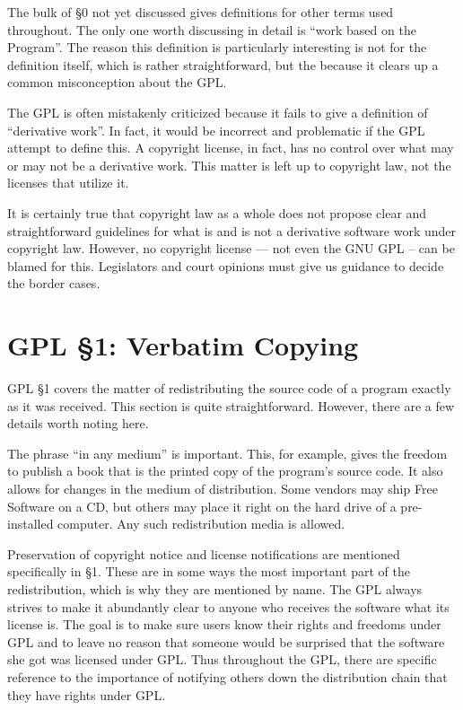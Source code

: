 \documentclass[12pt]{report}
\begin{document}
\medskip

The bulk of \S 0 not yet discussed gives definitions for other terms used
throughout.  The only one worth discussing in detail is ``work based on
the Program''.  The reason this definition is particularly interesting is
not for the definition itself, which is rather straightforward, but the
because it clears up a common misconception about the GPL\@.

The GPL is often mistakenly criticized because it fails to give a
definition of ``derivative work''.  In fact, it would be incorrect and
problematic if the GPL attempt to define this.  A copyright license, in
fact, has no control over what may or may not be a derivative work.  This
matter is left up to copyright law, not the licenses that utilize it.

It is certainly true that copyright law as a whole does not propose clear
and straightforward guidelines for what is and is not a derivative
software work under copyright law.  However, no copyright license --- not
even the GNU GPL -- can be blamed for this.  Legislators and court
opinions must give us guidance to decide the border cases.

\section{GPL \S 1: Verbatim Copying}

GPL \S 1 covers the matter of redistributing the source code of a program
exactly as it was received.  This section is quite straightforward.
However, there are a few details worth noting here.

The phrase ``in any medium'' is important.  This, for example, gives the
freedom to publish a book that is the printed copy of the program's source
code.  It also allows for changes in the medium of distribution.  Some
vendors may ship Free Software on a CD, but others may place it right on
the hard drive of a pre-installed computer.  Any such redistribution media
is allowed.

Preservation of copyright notice and license notifications are mentioned
specifically in \S 1.  These are in some ways the most important part of
the redistribution, which is why they are mentioned by name.  The GPL
always strives to make it abundantly clear to anyone who receives the
software what its license is.  The goal is to make sure users know their
rights and freedoms under GPL and to leave no reason that someone would be
surprised that the software she got was licensed under GPL\@.  Thus
throughout the GPL, there are specific reference to the importance of
notifying others down the distribution chain that they have rights under
GPL.
\end{document}
